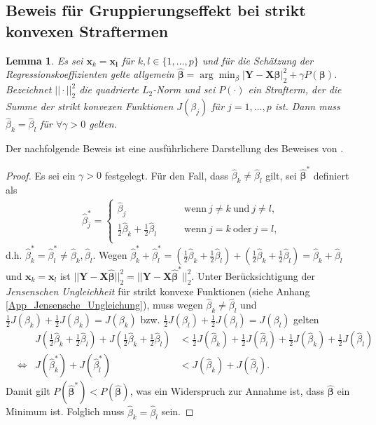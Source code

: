 \documentclass[12pt, a4paper]{report}\usepackage[]{graphicx}\usepackage[]{color}
\newtheorem{lemma}{Lemma}
\begin{document}
\begin{appendix}
\section{Beweis für Gruppierungseffekt bei strikt konvexen Straftermen}\label{App_GroupEffect_Strict_Conv}
\begin{lemma}
Es sei $\mathbf{x}_k = \mathbf{x_l}$ für $k,l \in \{1,\dots,p \}$ und für die Schätzung der Regressionskoeffizienten gelte allgemein $\boldsymbol{\hat{\beta}}=\arg \displaystyle\min_{\beta} |\mathbf{Y}-\mathbf{X}\boldsymbol{\beta}|^2_2 + \gamma P(\boldsymbol{\beta})$. Bezeichnet $||\cdot||^2_2$ die quadrierte $L_2$-Norm und sei $P(\cdot)$ ein Strafterm, der die Summe der \textit{strikt konvexen} Funktionen $J(\beta_j)$ für $j=1,\dots,p$ ist. Dann muss $\hat{\beta}_k = \hat{\beta}_l$ für $\forall \gamma > 0$ gelten.
\end{lemma}
Der nachfolgende Beweis ist eine ausführlichere Darstellung des Beweises von .
\begin{proof}
Es sei ein $\gamma > 0$ festgelegt. Für den Fall, dass $\hat{\beta}_k \neq \hat{\beta}_l$ gilt, sei $\boldsymbol{\hat{\beta}}^*$ definiert als
\begin{align*}
\hat{\beta}_j^*=
\begin{cases}
\hat{\beta}_j \qquad &\text{wenn} \ j \neq k \ \text{und} \ j \neq l,\\
\frac{1}{2}\hat{\beta}_k+\frac{1}{2}\hat{\beta}_l \qquad &\text{wenn} \ j = k \ \text{oder} \ j = l,\\
\end{cases}
\end{align*}
d.h. $\hat{\beta}_k^* = \hat{\beta}_l^* \neq \hat{\beta}_k,\hat{\beta}_l$. Wegen $\hat{\beta}_k^* + \hat{\beta}_l^*=(\frac{1}{2}\hat{\beta}_k+\frac{1}{2}\hat{\beta}_l) +  (\frac{1}{2}\hat{\beta}_k+\frac{1}{2}\hat{\beta}_l) = \hat{\beta}_k + \hat{\beta}_l$ und $\mathbf{x}_k = \mathbf{x}_l$ ist $||\mathbf{Y}-\mathbf{X}\boldsymbol{\hat{\beta}}||^2_2=||\mathbf{Y}-\mathbf{X}\boldsymbol{\hat{\beta}}^*||^2_2$.  
Unter Berücksichtigung der \textit{Jensenschen Ungleichheit} für strikt konvexe Funktionen (siehe Anhang \ref{App_Jensensche_Ungleichung}), 
muss wegen $\hat{\beta}_k \neq \hat{\beta}_l$ und $\frac{1}{2} J(\beta_k)+\frac{1}{2} J(\beta_k)= J(\beta_k)$ bzw. $\frac{1}{2} J(\beta_l)+\frac{1}{2} J(\beta_l)= J(\beta_l)$ gelten
\begin{align*}
&& J \left( \frac{1}{2}\hat{\beta}_k+\frac{1}{2}\hat{\beta}_l \right) + J \left( \frac{1}{2}\hat{\beta}_k+\frac{1}{2}\hat{\beta}_l \right) &< \frac{1}{2}J(\hat{\beta}_k) + \frac{1}{2}J(\hat{\beta}_l) +\frac{1}{2}J(\hat{\beta}_k)+\frac{1}{2}J(\hat{\beta}_l) \\
&\Leftrightarrow& J (\hat{\beta}_k^*) + J (\hat{\beta}_l^*) &< J(\hat{\beta}_k) + J(\hat{\beta}_l).
\end{align*}
Damit gilt $P(\boldsymbol{\hat{\beta}^*}) <  P(\boldsymbol{\hat{\beta}})$, was ein Widerspruch zur Annahme ist, dass $\boldsymbol{\hat{\beta}}$ ein Minimum ist. Folglich muss $\hat{\beta}_k =\hat{\beta}_l$ sein.
\end{proof}


\end{appendix}
\end{document}
